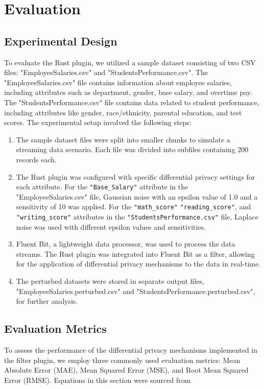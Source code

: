 \chapter{Evaluation\label{chap:evaluation}}
\section{Experimental Design}
To evaluate the Rust plugin, we utilized a sample dataset consisting of two CSV files: "EmployeeSalaries.csv" and "StudentsPerformance.csv". The "EmployeeSalaries.csv" file contains information about employee salaries, including attributes such as department, gender, base salary, and overtime pay. The "StudentsPerformance.csv" file contains data related to student performance, including attributes like gender, race/ethnicity, parental education, and test scores.
The experimental setup involved the following steps:
\begin{enumerate}
    \item The sample dataset files were split into smaller chunks to simulate a streaming data scenario. Each file was divided into subfiles containing 200 records each.
    \item The Rust plugin was configured with specific differential privacy settings for each attribute. For the \texttt{"Base\_Salary"} attribute in the "EmployeeSalaries.csv" file, Gaussian noise with an epsilon value of 1.0 and a sensitivity of 10 was applied. For the \texttt{"math\_score"} \texttt{"reading\_score"}, and \texttt{"writing\_score"} attributes in the \texttt{"StudentsPerformance.csv"} file, Laplace noise was used with different epsilon values and sensitivities.
    \item Fluent Bit, a lightweight data processor, was used to process the data streams. The Rust plugin was integrated into Fluent Bit as a filter, allowing for the application of differential privacy mechanisms to the data in real-time.
    \item The perturbed datasets were stored in separate output files, "EmployeeSalaries.perturbed.csv" and "StudentsPerformance.perturbed.csv", for further analysis.
\end{enumerate}

\section{Evaluation Metrics}
To assess the performance of the differential privacy mechanisms implemented in the filter plugin, we employ three commonly used evaluation metrics: Mean Absolute Error (MAE), Mean Squared Error (MSE), and Root Mean Squared Error (RMSE). Equations in this section were sourced from \cite{Hodson2022}
